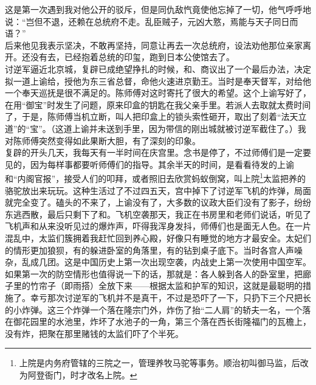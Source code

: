 这是第一次遇到我对他公开的驳斥，但是同仇敌忾竟使他忘掉了一切，他气呼呼地说：“岂但不退，还赖在总统府不走。乱臣贼子，元凶大憝，焉能与天子同日而语？”\\

后来他见我表示坚决，不敢再坚持，同意让再去一次总统府，设法劝他那位亲家离开。还没有去，已经抱着总统的印玺，跑到日本公使馆去了。\\

讨逆军逼近北京城，复辟已成绝望挣扎的时候，和、商议出了一个最后办法，决定拟一道上谕给，授他为东三省总督，命他火速进京勤王。当时是奉天督军，对给他一个奉天巡抚是很不满足的。陈师傅对这时寄托了很大的希望。这个上谕写好了，在用“御宝”时发生了问题，原来印盒的钥匙在我父亲手里。若派人去取就太费时间了，于是，陈师傅当机立断，叫人把印盒上的锁头索性砸开，取出了刻着“法天立道”的“宝”。（这道上谕并未送到手里，因为带信的刚出城就被讨逆军截住了。）我对陈师傅突然变得如此果断大胆，有了深刻的印象。\\

复辟的开头几天，我每天有一半时间在庆宫里。念书是停了，不过师傅们是一定要见的，因为每样事都要听师傅们的指导。其余半天的时间，是看看待发的上谕和“内阁官报”，接受人们的叩拜，或者照旧去欣赏蚂蚁倒窝，叫上院\footnote{上院是内务府管辖的三院之一，管理养牧马驼等事务。顺治初叫御马监，后改为阿登衙门，时才改名上院。}太监把养的骆驼放出来玩玩。这种生活过了不过四五天，宫中掉下了讨逆军飞机的炸弹，局面就完全变了。磕头的不来了，上谕没有了，大多数的议政大臣们没有了影子，纷纷东逃西散，最后只剩下了和。飞机空袭那天，我正在书房里和老师们说话，听见了飞机声和从来没听见过的爆炸声，吓得我浑身发抖，师傅们也是面无人色。在一片混乱中，太监们簇拥着我赶忙回到养心殿，好像只有睡觉的地方才最安全。太妃们的情形更加狼狈，有的躲进卧室的角落里，有的钻到桌子底下。当时各宫人声噪杂，乱成几团。这是中国历史上第一次出现空袭，内战史上第一次使用中国空军。如果第一次的防空情形也值得说一下的话，那就是：各人躲到各人的卧室里，把廊子里的竹帘子（即雨搭）全放下来——根据太监和护军的知识，这就是最聪明的措施了。幸亏那次讨逆军的飞机并不是真干，不过是恐吓了一下，只扔下三个尺把长的小炸弹。这三个炸弹一个落在隆宗门外，炸伤了抬“二人肩”的轿夫一名，一个落在御花园里的水池里，炸坏了水池子的一角，第三个落在西长街隆福门的瓦檐上，没有炸，把聚在那里赌钱的太监们吓了个半死。\\

